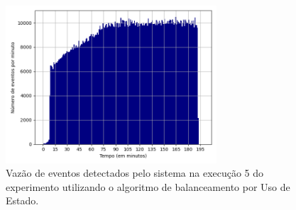 



\begin{figure}[h]
\centering
\includegraphics[width=0.7\textwidth]{figuras/graphics/histogram_vazao_10-dez-su.png}
\caption{Vazão de eventos detectados pelo sistema na execução 5 do experimento utilizando o algoritmo de balanceamento por Uso de Estado.}
\label{fig:vazao_10-dez-su}
\end{figure}





